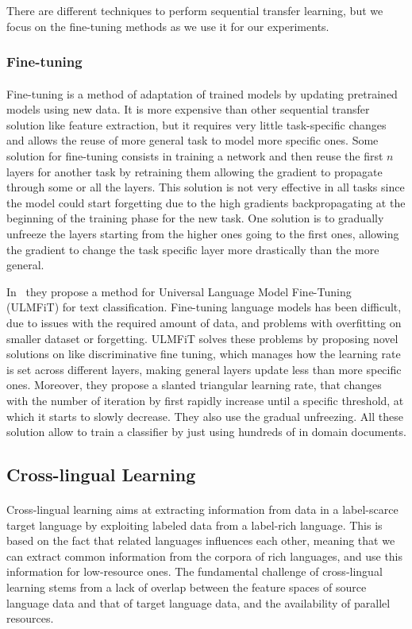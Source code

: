 There are different techniques to perform sequential transfer learning, but we focus on the fine-tuning methods as we use it for our experiments. 

\subsubsection{Fine-tuning}
\paragraph{}
Fine-tuning is a method of adaptation of trained models by updating pretrained models using new data. It is more expensive than other sequential transfer solution like feature extraction, but it requires very little task-specific changes and allows the reuse of more general task to model more specific ones.
Some solution for fine-tuning consists in training a network and then reuse the first $n$ layers for another task by retraining them allowing the gradient to propagate through some or all the layers. This solution is not very effective in all tasks since the model could start forgetting due to the high gradients backpropagating at the beginning of the training phase for the new task. One solution is to gradually unfreeze the layers starting from the higher ones going to the first ones, allowing the gradient to change the task specific layer more drastically than the more general. 

In~\citep{howard-ruder-2018-universal} they propose a method for Universal Language Model Fine-Tuning (ULMFiT) for text classification. Fine-tuning language models has been difficult, due to issues with the required amount of data, and problems with overfitting on smaller dataset or forgetting. ULMFiT solves these problems by proposing novel solutions on like discriminative fine tuning, which manages how the learning rate is set across different layers, making general layers update less than more specific ones. Moreover, they propose a slanted triangular learning rate, that changes with the number of iteration by first rapidly increase until a specific threshold, at which it starts to slowly decrease. They also use the gradual unfreezing. All these solution allow to train a classifier by just using hundreds of in domain documents.

\subsection{Cross-lingual Learning}
\paragraph{}
Cross-lingual learning aims at extracting information from data in a label-scarce target language by exploiting labeled data from a label-rich language. This is based on the fact that related languages influences each other, meaning that we can extract common information from the corpora of rich languages, and use this information for low-resource ones.  The fundamental challenge of cross-lingual learning stems from a lack of overlap between the feature spaces of source language data and that of target language data, and the availability of parallel resources. 

